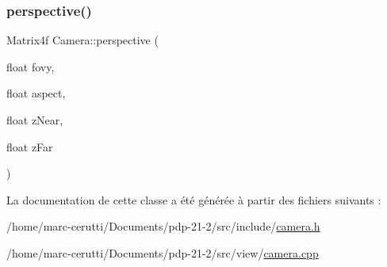\subsubsection{\texorpdfstring{perspective()}{perspective()}}
{\footnotesize\ttfamily Matrix4f Camera\+::perspective (\begin{DoxyParamCaption}\item[{float}]{fovy,  }\item[{float}]{aspect,  }\item[{float}]{z\+Near,  }\item[{float}]{z\+Far }\end{DoxyParamCaption})\hspace{0.3cm}{\ttfamily [static]}}



La documentation de cette classe a été générée à partir des fichiers suivants \+:\begin{DoxyCompactItemize}
\item 
/home/marc-\/cerutti/\+Documents/pdp-\/21-\/2/src/include/\hyperlink{camera_8h}{camera.\+h}\item 
/home/marc-\/cerutti/\+Documents/pdp-\/21-\/2/src/view/\hyperlink{camera_8cpp}{camera.\+cpp}\end{DoxyCompactItemize}
